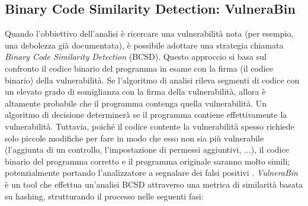 \documentclass[../main.tex]{subfiles}
\begin{document}
\subsection{Binary Code Similarity Detection: VulneraBin}
Quando l'obbiettivo dell'analisi è ricercare una vulnerabilità nota (per esempio, una debolezza già documentata), è possibile adottare una strategia chiamata \textit{Binary Code Similarity Detection} (BCSD).
Questo approccio si basa sul confronto il codice binario del programma in esame con la firma (il codice binario) della vulnerabilità.
Se l'algoritmo di analisi rileva segmenti di codice con un elevato grado di somiglianza con la firma della vulnerabilità, allora è altamente probabile che il programma
contenga quella vulnerabilità. Un algoritmo di decisione determinerà se il programma contiene effettivamente la vulnerabilità.
Tuttavia, poiché il codice contente la vulnerabilità spesso richiede solo piccole modifiche per fare in modo che esso non sia più vulnerabile (l'aggiunta di un controllo, l'impostazione di permessi aggiuntivi, ...), il codice binario del programma corretto e il programma originale
saranno molto simili; potenzialmente portando l'analizzatore a segnalare dei falsi positivi \cite{Survey_of_Binary_Code_Security_Analysis}. \newline
\textit{VulneraBin} \cite{VulneraBin} è un tool che effettua un'analisi BCSD attraverso una metrica di similarità basata su hashing, strutturando il processo nelle seguenti fasi:
\end{document}
